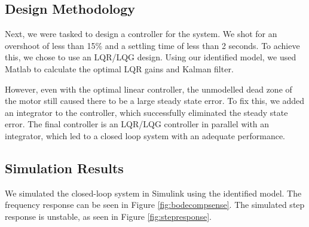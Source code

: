 \documentclass[11pt]{article}
\begin{document}
\subsection{Design Methodology}

Next, we were tasked to design a controller for the system. We shot for an overshoot of less than 15\%
and a settling time of less than 2 seconds. To achieve this, we chose to use an LQR/LQG design. Using our 
identified model, we used Matlab to calculate the optimal LQR gains and Kalman filter. 

However, even with the optimal linear controller, the unmodelled dead zone of the motor still caused
there to be a large steady state error. To fix this, we added an integrator to the controller, which successfully
eliminated the steady state error. The final controller is an LQR/LQG controller in parallel with an integrator, which led
to a closed loop system with an adequate performance.

\subsection{Simulation Results}
We simulated the closed-loop system in Simulink using the identified model. The frequency response
can be seen in Figure \ref{fig:bodecompsense}. The simulated step response is unstable, as 
seen in Figure \ref{fig:stepresponse}.
\end{document}
